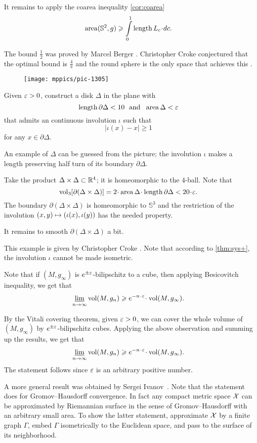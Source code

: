 It remains to apply the coarea inequality \ref{cor:coarea}
\[\area(\mathbb{S}^2,g)\ge \int\limits_0^1\length L_c\cdot dc.\]

The bound $\tfrac12$ was proved by Marcel Berger \cite{berger}. 
Christopher Croke conjectured that the optimal bound is $\tfrac4\pi$ and the round sphere is the only space that achieves this \cite[Conjecture 0.3 in][]{croke}.

\begin{wrapfigure}{r}{20 mm}
\vskip-0mm
\centering
\texttt{[image: mppics/pic-1305]}
\end{wrapfigure}

Given $\varepsilon>0$, construct a disk $\Delta$ in the plane with 
\[\mathop{\rm length}\nolimits\partial \Delta<10\ \ \text{and}\ \ \operatorname{\rm area}\nolimits \Delta<\varepsilon\]
that admits an continuous involution $\iota$ such that 
\[|\iota(x)-x|\ge 1\]
for any $x\in\partial \Delta$.

An example of $\Delta$ can be guessed from the picture;
the involution $\iota$ makes a length preserving half turn of its boundary $\partial \Delta$.


Take the product $\Delta\times \Delta\subset \mathbb{R}^4$;
it is homeomorphic to the 4-ball.
Note that 
$$\vol_3[\partial(\Delta\times \Delta)]=2\cdot\area \Delta\cdot\length \partial \Delta<20\cdot\eps.$$
The boundary $\partial(\Delta\times \Delta)$ is homeomorphic to $\mathbb{S}^3$
and the restriction of the involution $(x,y)\z\mapsto (\iota(x),\iota(y))$ has the needed property.

It remains to smooth $\partial(\Delta\times \Delta)$ a  bit.

 This example is given by Christopher Croke \cite{croke}.
Note that according to \ref{thm:sys+}, 
the involution $\iota$ cannot be made isometric.

Note that if $(M,g_\infty)$ is $e^{\pm\varepsilon}$-bilipschitz to a cube, then applying Besicovitch inequality, we get that 
\[\liminf_{n\to\infty} \vol (M,g_n)\ge e^{-n\cdot \eps}\cdot\vol (M,g_\infty).\]

By the Vitali covering theorem, given $\varepsilon>0$, we can cover the whole volume of $(M,g_\infty)$ by $e^{\pm\varepsilon}$-bilipschitz cubes.
Applying the above observation and summing up the results, we get that 
\[\liminf_{n\to\infty} \vol (M,g_n)\ge e^{-n\cdot \eps}\cdot\vol (M,g_\infty).\]
The statement follows since $\varepsilon$ is an arbitrary positive number.

A more general result was obtained by Sergei Ivanov~\cite{ivanov-1997}.
Note that the statement does for Gromov--Hausdorff convergence.
In fact any compact metric space $\mathcal{X}$ can be approximated by Riemannian surface in the sense of Gromov--Hausdorff with an arbitrary small area.
To show the latter statement, approximate $\mathcal{X}$ by a finite graph $\Gamma$, embed $\Gamma$ isometrically to the Euclidean space, and pass to the surface of its neighborhood.

